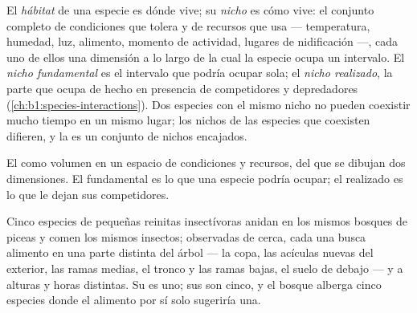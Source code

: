 \begin{definition}\label{def:b1:ecosystem-organization:niche}
El \emph{hábitat} de una especie es dónde vive; su \emph{nicho} es cómo
vive: el conjunto completo de condiciones que tolera y de recursos que usa
--- temperatura, humedad, luz, alimento, momento de actividad, lugares de
nidificación ---, cada uno de ellos una dimensión a lo largo de la cual la
especie ocupa un intervalo. El \emph{nicho fundamental} es el intervalo que
podría ocupar sola; el \emph{nicho realizado}, la parte que ocupa de hecho
en presencia de competidores y depredadores
(\cref{ch:b1:species-interactions}). Dos especies con el mismo nicho no
pueden coexistir mucho tiempo en un mismo lugar; los nichos de las especies
que coexisten difieren, y la  es un conjunto de nichos encajados.
\end{definition}

\begin{omfigure}

{\small El  como volumen en un espacio de condiciones y recursos, del
que se dibujan dos dimensiones. El  fundamental es lo que una especie
podría ocupar; el  realizado es lo que le dejan sus competidores.}
\end{omfigure}

\begin{example}\label{ex:b1:ecosystem-organization:warblers}
Cinco especies de pequeñas reinitas insectívoras anidan en los mismos
bosques de piceas y comen los mismos insectos; observadas de cerca, cada una
busca alimento en una parte distinta del árbol --- la copa, las acículas
nuevas del exterior, las ramas medias, el tronco y las ramas bajas, el suelo
de debajo --- y a alturas y horas distintas. Su  es uno; sus 
son cinco, y el bosque alberga cinco especies donde el alimento por sí solo
sugeriría una.
\end{example}

